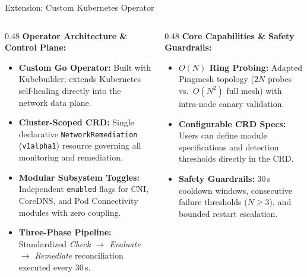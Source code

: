 \documentclass[aspectratio=169, 11pt]{beamer}
\begin{document}
\begin{frame}{Extension: Custom Kubernetes Operator}
\footnotesize

\begin{columns}[T]
\begin{column}{0.48\textwidth}
\textbf{Operator Architecture \& Control Plane:}
\begin{itemize}
  \item \textbf{Custom Go Operator:} Built with Kubebuilder; extends Kubernetes self-healing directly into the network data plane.
  \item \textbf{Cluster-Scoped CRD:} Single declarative \texttt{NetworkRemediation} (\texttt{v1alpha1}) resource governing all monitoring and remediation.
  \item \textbf{Modular Subsystem Toggles:} Independent \texttt{enabled} flags for CNI, CoreDNS, and Pod Connectivity modules with zero coupling.
  \item \textbf{Three-Phase Pipeline:} Standardized \emph{Check $\to$ Evaluate $\to$ Remediate} reconciliation executed every 30\,s.
\end{itemize}
\end{column}

\begin{column}{0.48\textwidth}
\textbf{Core Capabilities \& Safety Guardrails:}
\begin{itemize}
  \item \textbf{$O(N)$ Ring Probing:} Adapted Pingmesh topology ($2N$ probes vs.\ $O(N^2)$ full mesh) with intra-node canary validation.
  \item \textbf{Configurable CRD Specs:} Users can define module specifications and detection thresholds directly in the CRD.
  \item \textbf{Safety Guardrails:} 30\,s cooldown windows, consecutive failure thresholds ($N \ge 3$), and bounded restart escalation.
\end{itemize}
\end{column}
\end{columns}

\end{frame}
\end{document}
